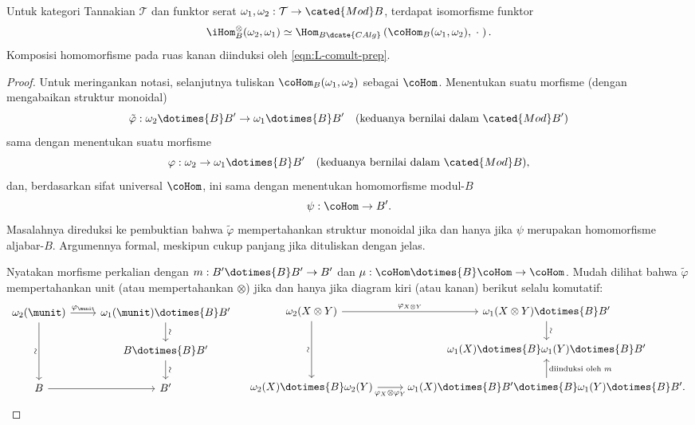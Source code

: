 \begin{proposition}\label{prop:Isom-Tannakian}
	Untuk kategori Tannakian $\mathcal{T}$ dan funktor serat $\omega_1,\omega_2:\mathcal{T}\to\cated{Mod}B$, terdapat isomorfisme funktor
	\[ \iHom^\otimes_B(\omega_2, \omega_1) \simeq \Hom_{B\dcate{CAlg}}\left( \coHom_B(\omega_1, \omega_2) , \; \cdot \; \right). \]
	Komposisi homomorfisme pada ruas kanan diinduksi oleh \eqref{eqn:L-comult-prep}.
\end{proposition}
\begin{proof}
	Untuk meringankan notasi, selanjutnya tuliskan $\coHom_B(\omega_1,\omega_2)$
	sebagai $\coHom$. Menentukan suatu morfisme (dengan mengabaikan struktur
	monoidal)
	\[ \tilde{\varphi}: \omega_2 \dotimes{B} B' \to \omega_1 \dotimes{B} B' \quad (\text{keduanya bernilai dalam }\cated{Mod}B') \]
sama dengan menentukan suatu morfisme
	\[ \varphi: \omega_2 \to \omega_1 \dotimes{B} B' \quad (\text{keduanya bernilai dalam }\cated{Mod}B), \]
dan, berdasarkan sifat universal $\coHom$, ini sama dengan menentukan homomorfisme modul-$B$
	\[ \psi: \coHom \to B'. \]
Masalahnya direduksi ke pembuktian bahwa $\tilde{\varphi}$ mempertahankan struktur monoidal jika dan hanya jika $\psi$ merupakan homomorfisme aljabar-$B$. Argumennya formal, meskipun cukup panjang jika dituliskan dengan jelas.
	
	Nyatakan morfisme perkalian dengan $m:B'\dotimes{B}B'\to B'$ dan $\mu:\coHom\dotimes{B}\coHom\to\coHom$. Mudah dilihat bahwa $\tilde{\varphi}$ mempertahankan unit (atau mempertahankan $\otimes$) jika dan hanya jika diagram kiri (atau kanan) berikut selalu komutatif:
	\[\begin{tikzcd}
		\omega_2(\munit) \arrow[dd, "\sim"' sloped] \arrow[r, "{\varphi_{\munit}}"] & \omega_1(\munit) \dotimes{B} B' \arrow[d, "\sim" sloped] \\
		& B \dotimes{B} B' \arrow[d, "\sim" sloped] \\
		B \arrow[r] & B'
	\end{tikzcd} \quad
	\begin{tikzcd}
		\omega_2(X \otimes Y) \arrow[r, "{\varphi_{X \otimes Y}}"] \arrow[dd, "\sim"' sloped] & \omega_1(X \otimes Y) \dotimes{B} B' \arrow[d, "\sim" sloped] \\
		& \omega_1(X) \dotimes{B} \omega_1(Y) \dotimes{B} B' \\
		\omega_2(X) \dotimes{B} \omega_2(Y) \arrow[r, "{\varphi_X \otimes \varphi_Y}"'] & \omega_1(X) \dotimes{B} B' \dotimes{B} \omega_1(Y) \dotimes{B} B' . \arrow[u, "{\text{diinduksi oleh }m}"']
	\end{tikzcd}\]


\end{proof}
